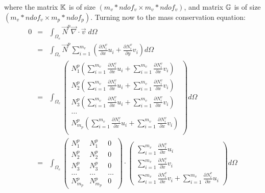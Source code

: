 where the matrix ${\mathbb{K}}$ is of size $(m_v*ndof_v \times m_v*ndof_v)$, 
and matrix ${{\mathbb{G}}}$ is of size $(m_v*ndof_v \times m_p*ndof_p)$.
Turning now to the mass conservation equation:
\begin{eqnarray}
0&=&\int_{\Omega_e} \vec{N}^p {\vec \nabla}\cdot {\vec v} \; d\Omega \nonumber\\
&=& \int_{\Omega_e} \vec{N}^p \sum_{i=1}^{m_v} 
\left( \frac{\partial N_i^v}{\partial x} u_i + \frac{\partial N_i^v}{\partial y} v_i \right)  d\Omega \nonumber\\
&=& 
\int_{\Omega_e} 
\left(
\begin{array}{c}
N_1^p \left(\sum\limits_{i=1}^{m_v} \frac{\partial N_i^v }{\partial x} u_i +
\sum\limits_{i=1}^{m_v} \frac{\partial N_i^v }{\partial x} v_i \right) \\
N_2^p \left(\sum\limits_{i=1}^{m_v} \frac{\partial N_i^v }{\partial x} u_i +
\sum\limits_{i=1}^{m_v} \frac{\partial N_i^v }{\partial x} v_i \right) \\
N_3^p \left(\sum\limits_{i=1}^{m_v} \frac{\partial N_i^v }{\partial x} u_i +
\sum\limits_{i=1}^{m_v} \frac{\partial N_i^v }{\partial x} v_i \right) \\
\dots \\
N_{m_p}^p \left(\sum\limits_{i=1}^{m_v} \frac{\partial N_i^v }{\partial x} u_i +
\sum\limits_{i=1}^{m_v} \frac{\partial N_i^v }{\partial x} v_i \right) \\
\end{array}
\right) d \Omega \nonumber \\  %
&=& 
\int_{\Omega_e} 
\left(
\begin{array}{ccc}
{N}_1^p & {N}_1^p & 0 \\
{N}_2^p & {N}_2^p & 0 \\
{N}_3^p & {N}_3^p & 0 \\
\dots & \dots & \dots \\
{N}_{m_p}^p & {N}_{m_p}^p & 0 
\end{array}
\right)
\cdot
\left(
\begin{array}{c}
\sum\limits_{i=1}^{m_v} \frac{\partial N_i^v }{\partial x} u_i \\ 
\sum\limits_{i=1}^{m_v} \frac{\partial N_i^v }{\partial x} v_i \\
\sum\limits_{i=1}^{m_v} \frac{\partial N_i^v }{\partial x} v_i +
\sum\limits_{i=1}^{m_v} \frac{\partial N_i^v }{\partial x} u_i 
\end{array}
\right) d\Omega \nonumber\\ %

\end{eqnarray}
